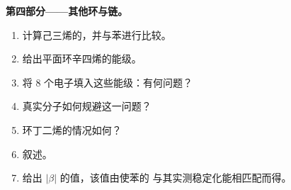 \begin{problem}
\medskip
\noindent\textbf{第四部分——其他环与链。}
\begin{enumerate}[resume]
  \item 计算己三烯的，并与苯进行比较。
  \item 给出平面环辛四烯的能级。
  \item 将 8 个电子填入这些能级：有何问题？
  \item 真实分子如何规避这一问题？
  \item 环丁二烯的情况如何？
  \item 叙述。
  \item 给出 $|\beta|$ 的值，该值由使苯的
        与其实测稳定化能相匹配而得。
\end{enumerate}
\end{problem}
